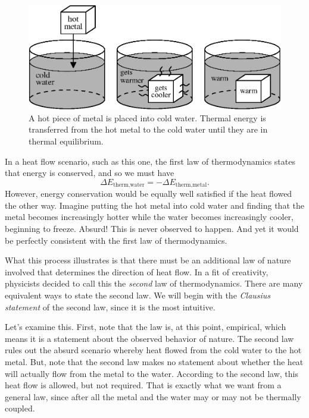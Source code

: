 \begin{figure}
\begin{center}
\includegraphics[width=4.6in]{second_law_and_entropy/paradigm}
\caption{A hot piece of metal is placed into cold water.  Thermal
  energy is transferred from the hot metal to the cold water until
  they are in thermal equilibrium.}
\label{fig:paradigmatic_process}
\end{center}
\end{figure}

In a heat flow scenario, such as this one, the first law of
thermodynamics states that energy is conserved, and so we must have
\begin{equation}
\Delta E_\text{therm,water} = -\Delta E_\text{therm,metal}.
\end{equation}
However, energy conservation would be equally well satisfied if the
heat flowed the other way.  Imagine putting the hot metal into cold
water and finding that the metal becomes increasingly hotter while the
water becomes increasingly cooler, beginning to freeze.  Absurd!  This
is never observed to happen.  And yet it would be perfectly consistent
with the first law of thermodynamics.

What this process illustrates is that there must be an additional law
of nature involved that determines the direction of heat flow.  In a
fit of creativity, physicists decided to call this the {\it second}
law of thermodynamics.  There are many equivalent ways to state the
second law.  We will begin with the {\it Clausius statement} of the
second law, since it is the most intuitive.


Let's examine this.  First, note that the law is, at this point,
empirical, which means it is a statement about the observed behavior
of nature.  The second law rules out the absurd scenario whereby heat
flowed from the cold water to the hot metal.  But, note that the
second law makes no statement about whether the heat will actually
flow from the metal to the water.  According to the second law, this heat
flow is allowed, but not required.  That is exactly what we want from
a general law, since after all the metal and the water may or may not
be thermally coupled.

